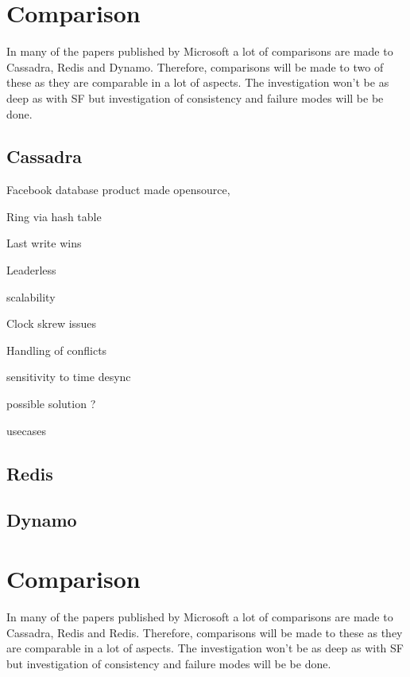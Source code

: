 \documentclass[a4paper,10pt,titlepage]{report}
\begin{document}
    \section{Comparison}
    In many of the papers published by Microsoft a lot of comparisons are made to Cassadra, Redis and Dynamo. Therefore, comparisons will be made to two of these as they are comparable in a lot of aspects. The investigation won't be as deep as with SF but investigation of consistency and failure modes will be be done.
    
    
    
    \subsection{Cassadra}
    
    Facebook database product made opensource,
    
    Ring via hash table
    
    Last write wins
    
    Leaderless
    
    scalability
    
    Clock skrew issues
    
    Handling of conflicts
    
    sensitivity to time desync
    
    possible solution ?
    
    usecases
    
    

    \subsection{Redis}

    \subsection{Dynamo}


    \section{Comparison}
    In many of the papers published by Microsoft a lot of comparisons are made to Cassadra, Redis and Redis. Therefore, comparisons will be made to these as they are comparable in a lot of aspects. The investigation won't be as deep as with SF but investigation of consistency and failure modes will be be done.
\end{document}
